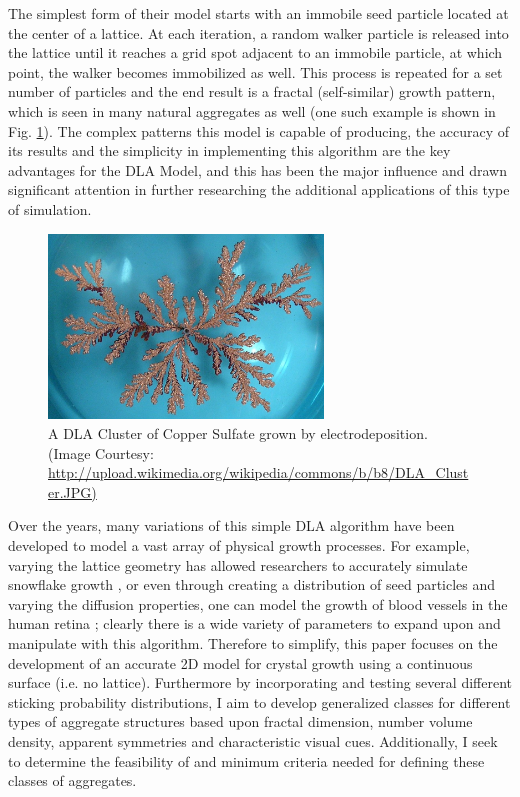 \documentclass{article}
\begin{document}
The simplest form of their model starts with an immobile seed particle located at the center of a lattice. At each iteration, a random walker particle is released into the lattice until it reaches a grid spot adjacent to an immobile particle, at which point, the walker becomes immobilized as well. This process is repeated for a set number of particles and the end result is a fractal (self-similar) growth pattern, which is seen in many natural aggregates as well (one such example is shown in Fig. \ref{DLA_Cluster}). The complex patterns this model is capable of producing, the accuracy of its results and the simplicity in implementing this algorithm are the key advantages for the DLA Model, and this has been the major influence and drawn significant attention in further researching the additional applications of this type of simulation.

\begin{figure}[h]
\begin{center}
	\includegraphics[width=0.65\textwidth]{DLA_Cluster}
	\caption{A DLA Cluster of Copper Sulfate grown by electrodeposition. (Image Courtesy: 
	\url{http://upload.wikimedia.org/wikipedia/commons/b/b8/DLA_Cluster.JPG)}}
	\label{DLA_Cluster}
\end{center}
\end{figure}

Over the years, many variations of this simple DLA algorithm have been developed to model a vast array of physical growth processes. For example, varying the lattice geometry has allowed researchers to accurately simulate snowflake growth \cite{nitt}, or even through creating a distribution of seed particles and varying the diffusion properties, one can model the growth of blood vessels in the human retina \cite{retina}; clearly there is a wide variety of parameters to expand upon and manipulate with this algorithm. Therefore to simplify, this paper focuses on the development of an accurate 2D model for crystal growth using a continuous surface (i.e. no lattice). Furthermore by incorporating and testing several different sticking probability distributions, I aim to develop generalized classes for different types of aggregate structures based upon fractal dimension, number volume density, apparent symmetries and characteristic visual cues. Additionally, I seek to determine the feasibility of and minimum criteria needed for defining these classes of aggregates.
\end{document}
